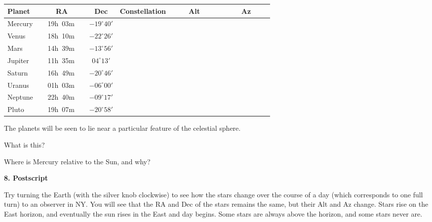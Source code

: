 \medskip
\begin{center}
\begin{tabular}{lccccc} \hline
Planet  & \ \ \ \ RA  \ \ \ & \hspace{1.5cm} Dec \hspace{1.5cm} &
         Constellation &\ \ \ \  Alt \ \ \ \ & \ \ \ \  Az\ \ \  \ \\ 
         \hline
Mercury   & 19h~03m & $-19^\circ 40'$  & & &       \\ \hline
Venus   & 18h~10m & $-22^\circ 26'$  &     & &    \\ \hline
Mars & 14h~39m & $-13^\circ 56'$  &     & &    \\ \hline
Jupiter  & 11h~35m & $04^\circ 13'$  &   & &      \\ \hline
Saturn  & 16h~49m & $-20^\circ 46'$  &   & &      \\  \hline
Uranus & 01h~03m & $-06^\circ 00'$  &    & &   \\  \hline 
Neptune  & 22h~40m & $-09^\circ 17'$  &   & &    \\  \hline 
Pluto  & 19h~07m &  $-20^\circ 58'$ &   & &    \\  \hline 
\end{tabular}
\end{center}

\noindent The planets will be seen to lie near a particular feature of the
celestial sphere. 

\noindent What is this? \makebox[4cm]{\hrulefill}

\noindent Where is Mercury relative to the Sun, and why?

\bigskip
\bigskip
\bigskip
\noindent 
{\bf 8. Postscript}

\bigskip\noindent
Try turning the Earth (with the silver knob clockwise) to see how the
stars change over the course of a day (which corresponds to one full
turn) to an observer in NY.  You will see that the RA and Dec of the
stars remains the same, but their Alt and Az change. Stars rise on the
East horizon, and eventually the sun rises in the East and day
begins. Some stars are always above the horizon, and some stars never
are.


